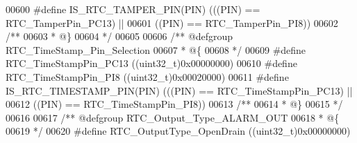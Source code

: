 \begin{DoxyCode}
00600 \textcolor{preprocessor}{#}\textcolor{preprocessor}{define} \textcolor{preprocessor}{IS\_RTC\_TAMPER\_PIN}\textcolor{preprocessor}{(}\textcolor{preprocessor}{PIN}\textcolor{preprocessor}{)} \textcolor{preprocessor}{(}\textcolor{preprocessor}{(}\textcolor{preprocessor}{(}\textcolor{preprocessor}{PIN}\textcolor{preprocessor}{)} \textcolor{preprocessor}{==} RTC_TamperPin_PC13\textcolor{preprocessor}{)} \textcolor{preprocessor}{||}
00601                                 \textcolor{preprocessor}{(}\textcolor{preprocessor}{(}\textcolor{preprocessor}{PIN}\textcolor{preprocessor}{)} \textcolor{preprocessor}{==} RTC_TamperPin_PI8\textcolor{preprocessor}{)}\textcolor{preprocessor}{)}
00602 \textcolor{comment}{/**}
00603 \textcolor{comment}{  * @\}}
00604 \textcolor{comment}{  */}
00605 
00606 \textcolor{comment}{/** @defgroup RTC\_TimeStamp\_Pin\_Selection }
00607 \textcolor{comment}{  * @\{}
00608 \textcolor{comment}{  */}
00609 \textcolor{preprocessor}{#}\textcolor{preprocessor}{define} \textcolor{preprocessor}{RTC\_TimeStampPin\_PC13}              \textcolor{preprocessor}{(}\textcolor{preprocessor}{(}\textcolor{preprocessor}{uint32\_t}\textcolor{preprocessor}{)}0x00000000\textcolor{preprocessor}{)}
00610 \textcolor{preprocessor}{#}\textcolor{preprocessor}{define} \textcolor{preprocessor}{RTC\_TimeStampPin\_PI8}               \textcolor{preprocessor}{(}\textcolor{preprocessor}{(}\textcolor{preprocessor}{uint32\_t}\textcolor{preprocessor}{)}0x00020000\textcolor{preprocessor}{)}
00611 \textcolor{preprocessor}{#}\textcolor{preprocessor}{define} \textcolor{preprocessor}{IS\_RTC\_TIMESTAMP\_PIN}\textcolor{preprocessor}{(}\textcolor{preprocessor}{PIN}\textcolor{preprocessor}{)} \textcolor{preprocessor}{(}\textcolor{preprocessor}{(}\textcolor{preprocessor}{(}\textcolor{preprocessor}{PIN}\textcolor{preprocessor}{)} \textcolor{preprocessor}{==} RTC_TimeStampPin_PC13\textcolor{preprocessor}{)} \textcolor{preprocessor}{||}
00612                                    \textcolor{preprocessor}{(}\textcolor{preprocessor}{(}\textcolor{preprocessor}{PIN}\textcolor{preprocessor}{)} \textcolor{preprocessor}{==} RTC_TimeStampPin_PI8\textcolor{preprocessor}{)}\textcolor{preprocessor}{)}
00613 \textcolor{comment}{/**}
00614 \textcolor{comment}{  * @\}}
00615 \textcolor{comment}{  */}
00616 
00617 \textcolor{comment}{/** @defgroup RTC\_Output\_Type\_ALARM\_OUT }
00618 \textcolor{comment}{  * @\{}
00619 \textcolor{comment}{  */}
00620 \textcolor{preprocessor}{#}\textcolor{preprocessor}{define} \textcolor{preprocessor}{RTC\_OutputType\_OpenDrain}           \textcolor{preprocessor}{(}\textcolor{preprocessor}{(}\textcolor{preprocessor}{uint32\_t}\textcolor{preprocessor}{)}0x00000000\textcolor{preprocessor}{)}

\end{DoxyCode}
